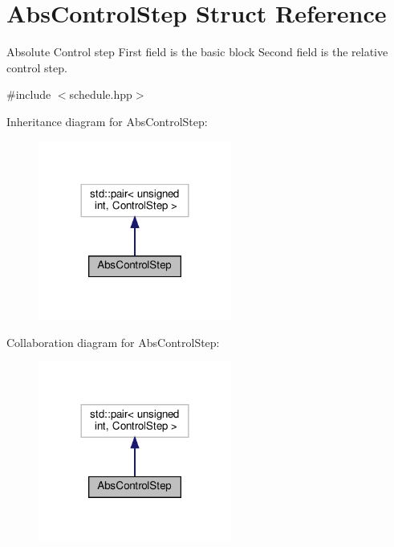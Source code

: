\hypertarget{structAbsControlStep}{}\section{Abs\+Control\+Step Struct Reference}
\label{structAbsControlStep}


Absolute Control step First field is the basic block Second field is the relative control step.  




{\ttfamily \#include $<$schedule.\+hpp$>$}



Inheritance diagram for Abs\+Control\+Step\+:
\nopagebreak
\begin{figure}[H]
\begin{center}
\leavevmode
\includegraphics[width=180pt]{d3/df2/structAbsControlStep__inherit__graph}
\end{center}
\end{figure}


Collaboration diagram for Abs\+Control\+Step\+:
\nopagebreak
\begin{figure}[H]
\begin{center}
\leavevmode
\includegraphics[width=180pt]{d8/d5f/structAbsControlStep__coll__graph}
\end{center}
\end{figure}
